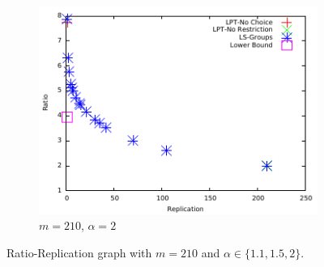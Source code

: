 \begin {figure}
    \begin{subfigure}[b]{0.5\textwidth}
      \includegraphics[width=\textwidth]{alpha_2.pdf}
      \caption{$m=210$, $\alpha=2$}
      \label{fig:3}
    \end{subfigure} %
  
    \caption{Ratio-Replication graph with $m=210$ and $\alpha \in \{1.1, 1.5, 2\}$.}
    \label{fig:Graph}
  \end{figure}

